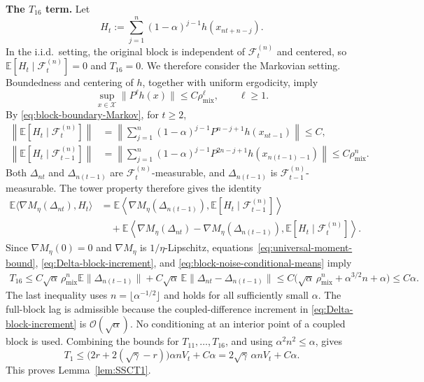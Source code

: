 \documentclass[11pt,letterpaper]{article}
\theoremstyle{plain}
\theoremstyle{definition}
\theoremstyle{remark}
\newcommand{\E}{\mathbb{E}}
\begin{document}
\noindent\textbf{The \(T_{16}\) term.}
Let
\[
    H_t:=\sum_{j=1}^n(1-\alpha)^{j-1}h(x_{nt+n-j}).
\]
In the i.i.d.\ setting, the original block is independent of
\(\mathcal F_t^{(n)}\) and centered, so
\(\E[H_t\mid\mathcal F_t^{(n)}]=0\) and \(T_{16}=0\).
We therefore consider the Markovian setting. Boundedness and centering of
\(h\), together with uniform ergodicity, imply
\[
    \sup_{x\in\mathcal X}\|P^\ell h(x)\|
    \leq C\rho_{\mathrm{mix}}^\ell,
    \qquad \ell\geq1.
\]
By \eqref{eq:block-boundary-Markov}, for \(t\geq2\),
\begin{align}
    \left\|\E[H_t\mid\mathcal F_t^{(n)}]\right\|
    &=\left\|\sum_{j=1}^n(1-\alpha)^{j-1}
        P^{n-j+1}h(x_{nt-1})\right\|
    \leq C,\nonumber\\
    \left\|\E[H_t\mid\mathcal F_{t-1}^{(n)}]\right\|
    &=\left\|\sum_{j=1}^n(1-\alpha)^{j-1}
        P^{2n-j+1}h(x_{n(t-1)-1})\right\|
    \leq C\rho_{\mathrm{mix}}^n.
    \label{eq:block-noise-conditional-means}
\end{align}
Both \(\Delta_{nt}\) and \(\Delta_{n(t-1)}\) are
\(\mathcal F_t^{(n)}\)-measurable, and
\(\Delta_{n(t-1)}\) is \(\mathcal F_{t-1}^{(n)}\)-measurable.
The tower property therefore gives the identity
\begin{align*}
    \E\langle\nabla M_\eta(\Delta_{nt}),H_t\rangle
    &=\E\left\langle\nabla M_\eta(\Delta_{n(t-1)}),
        \E[H_t\mid\mathcal F_{t-1}^{(n)}]\right\rangle\\
    &\quad +\E\left\langle
        \nabla M_\eta(\Delta_{nt})-\nabla M_\eta(\Delta_{n(t-1)}),
        \E[H_t\mid\mathcal F_t^{(n)}]\right\rangle.
\end{align*}
Since \(\nabla M_\eta(0)=0\) and \(\nabla M_\eta\) is
\(1/\eta\)-Lipschitz, equations~\eqref{eq:universal-moment-bound},
\eqref{eq:Delta-block-increment}, and
\eqref{eq:block-noise-conditional-means} imply
\begin{align*}
    T_{16}
    \leq C\sqrt\alpha\,\rho_{\mathrm{mix}}^n
        \E\|\Delta_{n(t-1)}\|
       +C\sqrt\alpha\,
        \E\|\Delta_{nt}-\Delta_{n(t-1)}\|\leq C\bigl(\sqrt\alpha\,\rho_{\mathrm{mix}}^n
                 +\alpha^{3/2}n+\alpha\bigr)
    \leq C\alpha.
\end{align*}
The last inequality uses \(n=\lfloor\alpha^{-1/2}\rfloor\) and holds
for all sufficiently small \(\alpha\). The full-block lag is admissible
because the coupled-difference increment in
\eqref{eq:Delta-block-increment} is \(\mathcal O(\sqrt\alpha)\).
No conditioning at an interior point of a coupled block is used. Combining the bounds for \(T_{11},\ldots,T_{16}\), and using
\(\alpha^2n^2\leq\alpha\), gives
\[
    T_1\leq
    \bigl(2r+2(\sqrt\gamma-r)\bigr)\alpha nV_t+C\alpha
    =2\sqrt\gamma\,\alpha nV_t+C\alpha.
\]
This proves Lemma~\ref{lem:SSCT1}.
\end{document}
